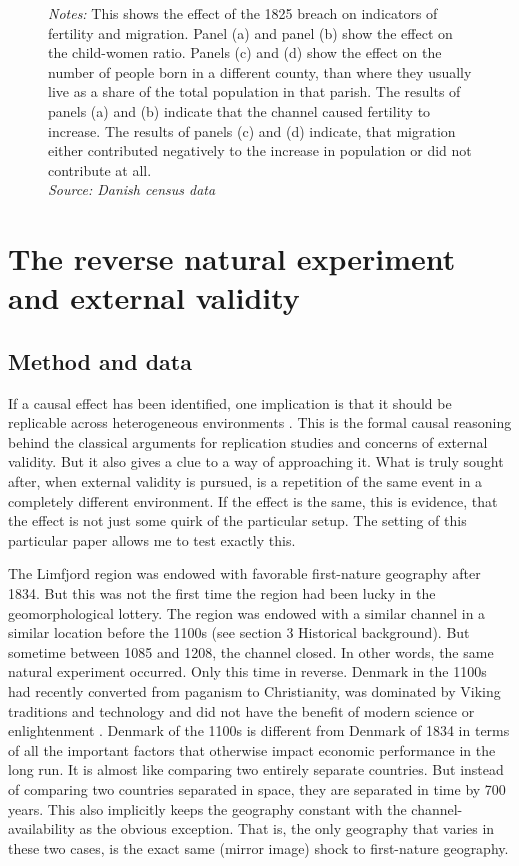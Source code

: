 \documentclass[11pt]{article}
\begin{document}
\begin{figure}
\begin{subfigure}[b]{0.45\textwidth}
    \end{subfigure}
    \parbox{0.9\textwidth}{
    \caption*{\footnotesize \textit{Notes:} This shows the effect of the 1825 breach on indicators of fertility and migration. Panel (a) and panel (b) show the effect on the child-women ratio. Panels (c) and (d) show the effect on the number of people born in a different county, than where they usually live as a share of the total population in that parish. The results of panels (a) and (b) indicate that the channel caused fertility to increase. The results of panels (c) and (d) indicate, that migration either contributed negatively to the increase in population or did not contribute at all.  \\ \textit{Source: Danish census data}}
}
    \label{fig:migr_fert}
\end{figure}

\FloatBarrier

\section{The reverse natural experiment and external validity}

\subsection{Method and data}
If a causal effect has been identified, one implication is that it should be replicable across heterogeneous environments \citep{Peters2016}. This is the formal causal reasoning behind the classical arguments for replication studies and concerns of external validity. But it also gives a clue to a way of approaching it. What is truly sought after, when external validity is pursued, is a repetition of the same event in a completely different environment. If the effect is the same, this is evidence, that the effect is not just some quirk of the particular setup. The setting of this particular paper allows me to test exactly this. 

The Limfjord region was endowed with favorable first-nature geography after 1834. But this was not the first time the region had been lucky in the geomorphological lottery. The region was endowed with a similar channel in a similar location before the 1100s (see section 3 Historical background). But sometime between 1085 and 1208, the channel closed. In other words, the same natural experiment occurred. Only this time in reverse. Denmark in the 1100s had recently converted from paganism to Christianity, was dominated by Viking traditions and technology and did not have the benefit of modern science or enlightenment \citep{Roesdahl2022, milkandbutter}. Denmark of the 1100s is different from Denmark of 1834 in terms of all the important factors that otherwise impact economic performance in the long run. It is almost like comparing two entirely separate countries. But instead of comparing two countries separated in space, they are separated in time by 700 years. This also implicitly keeps the geography constant with the channel-availability as the obvious exception. That is, the only geography that varies in these two cases, is the exact same (mirror image) shock to first-nature geography. 
\end{document}
